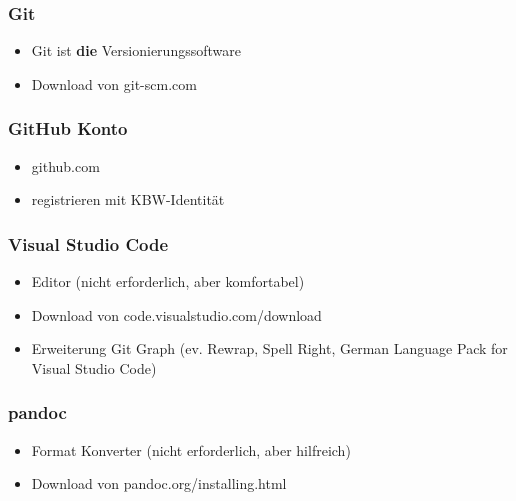 \documentclass[table]{beamer}
\begin{document}
    \begin{frame}
        \frametitle{Git}

        \begin{itemize}
            \item Git ist \textbf{die} Versionierungssoftware
            \item Download von git-scm.com 
        \end{itemize}
    
    \end{frame}

    \begin{frame}
        \frametitle{GitHub Konto}

        \begin{itemize}
            \item github.com 
            \item registrieren mit KBW-Identität
        \end{itemize}
    \end{frame}

    \begin{frame}
        \frametitle{Visual Studio Code}

        \begin{itemize}
            \item Editor (nicht erforderlich, aber komfortabel)
            \item Download von code.visualstudio.com/download 
            \item Erweiterung Git Graph (ev. Rewrap, Spell Right, German
            Language Pack for Visual Studio Code)
        \end{itemize}
    
    \end{frame}

    \begin{frame}
        \frametitle{pandoc}

        \begin{itemize}
            \item Format Konverter (nicht erforderlich, aber hilfreich)
            \item Download von pandoc.org/installing.html
        \end{itemize}   
            
    \end{frame}
\end{document}
